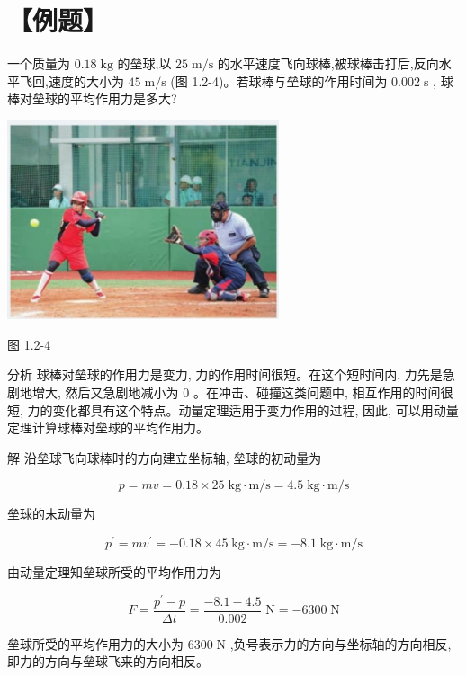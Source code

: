 \documentclass[10pt]{article}
\begin{document}
\section*{【例题】}

一个质量为 \({0.18}\mathrm{\;{kg}}\) 的垒球,以 \({25}\mathrm{\;m}/\mathrm{s}\) 的水平速度飞向球棒,被球棒击打后,反向水平飞回,速度的大小为 \({45}\mathrm{\;m}/\mathrm{s}\) (图 1.2-4)。若球棒与垒球的作用时间为 \({0.002}\mathrm{\;s}\) , 球棒对垒球的平均作用力是多大?

\begin{center}
\includegraphics[max width=0.6\textwidth]{images/01910e4c-ebb8-7d2c-8f2f-2375bc1d2d12_13_367172.jpg}
\end{center}

图 1.2-4

分析 球棒对垒球的作用力是变力, 力的作用时间很短。在这个短时间内, 力先是急剧地增大, 然后又急剧地减小为 0 。在冲击、碰撞这类问题中, 相互作用的时间很短, 力的变化都具有这个特点。动量定理适用于变力作用的过程, 因此, 可以用动量定理计算球棒对垒球的平均作用力。

解 沿垒球飞向球棒时的方向建立坐标轴, 垒球的初动量为

\[
p = {mv} = {0.18} \times {25}\mathrm{\;{kg}} \cdot \mathrm{m}/\mathrm{s} = {4.5}\mathrm{\;{kg}} \cdot \mathrm{m}/\mathrm{s}
\]

垒球的末动量为

\[
{p}^{\prime } = m{v}^{\prime } = - {0.18} \times {45}\mathrm{\;{kg}} \cdot \mathrm{m}/\mathrm{s} = - {8.1}\mathrm{\;{kg}} \cdot \mathrm{m}/\mathrm{s}
\]

由动量定理知垒球所受的平均作用力为

\[
F = \frac{{p}^{\prime } - p}{\Delta t} = \frac{-{8.1} - {4.5}}{0.002}\mathrm{\;N} = - {6300}\mathrm{\;N}
\]

垒球所受的平均作用力的大小为 \({6300}\mathrm{\;N}\) ,负号表示力的方向与坐标轴的方向相反, 即力的方向与垒球飞来的方向相反。
\end{document}
